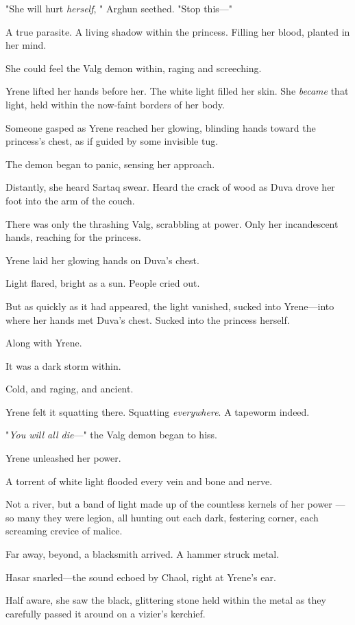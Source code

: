 "She will hurt \emph{herself}, " Arghun seethed.
"Stop this---"

A true parasite.
A living shadow within the princess.
Filling her blood, planted in her mind.

She could feel the Valg demon within, raging and screeching.

Yrene lifted her hands before her.
The white light filled her skin.
She \emph{became} that light, held within the now-faint borders of her body.

Someone gasped as Yrene reached her glowing, blinding hands toward the princess's chest, as if guided by some invisible tug.

The demon began to panic, sensing her approach.

Distantly, she heard Sartaq swear.
Heard the crack of wood as Duva drove her foot into the arm of the couch.

There was only the thrashing Valg, scrabbling at power.
Only her incandescent hands, reaching for the princess.

Yrene laid her glowing hands on Duva's chest.

Light flared, bright as a sun.
People cried out.

But as quickly as it had appeared, the light vanished, sucked into Yrene---into where her hands met Duva's chest.
Sucked into the princess herself.

Along with Yrene.

It was a dark storm within.

Cold, and raging, and ancient.

Yrene felt it squatting there.
Squatting \emph{everywhere}.
A tapeworm indeed.

"\emph{You will all die}---" the Valg demon began to hiss.

Yrene unleashed her power.

A torrent of white light flooded every vein and bone and nerve.

Not a river, but a band of light made up of the countless kernels of her power ---so many they were legion, all hunting out each dark, festering corner, each screaming crevice of malice.

Far away, beyond, a blacksmith arrived.
A hammer struck metal.

Hasar snarled---the sound echoed by Chaol, right at Yrene's ear.

Half aware, she saw the black, glittering stone held within the metal as they carefully passed it around on a vizier's kerchief.

